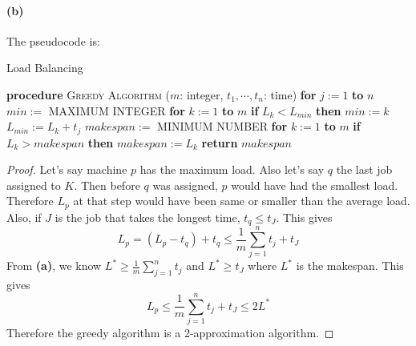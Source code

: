 \documentclass[10pt]{article}
\begin{document}
\paragraph{(b)} The pseudocode is:
\begin{algorithm}[H]
    \caption{Load Balancing}
    \begin{algorithmic}[1]
        \State \textbf{procedure} \textsc{Greedy Algorithm} ($m$: integer, $t_1, \cdots , t_n$: time)
            \State \hspace{0.53cm}\textbf{for} $j := 1$ \textbf{to} $n$
                \State \hspace{1.06cm}$min :=$ MAXIMUM INTEGER
                \State \hspace{1.06cm}\textbf{for} $k := 1$ \textbf{to} $m$
                    \State \hspace{1.59cm}\textbf{if} $L_k < L_{min}$ \textbf{then} $min := k$
                \State \hspace{1.06cm}$L_{min} := L_k + t_j$
            \State \hspace{0.53cm}$makespan :=$ MINIMUM NUMBER
            \State \hspace{0.53cm}\textbf{for} $k := 1$ \textbf{to} $m$
                \State \hspace{1.06cm}\textbf{if} $L_k > makespan$ \textbf{then} $makespan := L_k$
            \State \hspace{0.53cm}\textbf{return} $makespan$
    \end{algorithmic}
\end{algorithm}
\begin{proof}
    Let's say machine $p$ has the maximum load. Also let's say $q$ the last job assigned to $K$.
    Then before $q$ was assigned, $p$ would have had the smallest load. 
    Therefore $L_p$ at that step would have been same or smaller than the average load. 
    Also, if $J$ is the job that takes the longest time, $t_q \leq t_J$. This gives
    $$L_p = (L_p - t_q) + t_q \leq \frac{1}{m}\sum_{j=1}^{n}t_j + t_J$$
    From \textbf{(a)}, we know $L^* \geq \displaystyle \frac{1}{m}\sum_{j=1}^{n}t_j$ and $L^* \geq t_J$ where $L^*$ is the makespan. This gives
    $$L_p \leq \frac{1}{m}\sum_{j=1}^{n}t_j + t_J \leq 2L^*$$
    Therefore the greedy algorithm is a 2-approximation algorithm.

\end{proof}
\end{document}
